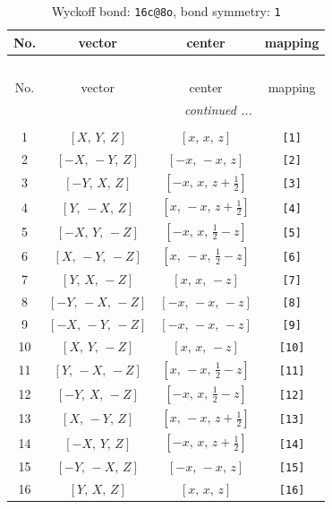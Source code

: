 \documentclass[fleqn,8pt]{jsarticle}
\begin{document}
\begin{longtable}{cccc}
\caption{Wyckoff bond: {\tt 16c@8o}, bond symmetry: {\tt 1}}
 \\
 \hline \hline
No. & vector & center & mapping \\ \hline \endfirsthead

\multicolumn{3}{l}{\tablename\ \thetable{}} \\
 \hline \hline
No. & vector & center & mapping \\ \hline \endhead

 \hline \hline
\multicolumn{3}{r}{\footnotesize\it continued ...} \\ \endfoot

 \hline \hline
\multicolumn{3}{r}{} \\ \endlastfoot

1 & $\left[ X,\, Y,\, Z \right]$ & $\left[ x,\, x,\, z \right]$ & {\tt [1]} \\ \hline
2 & $\left[ - X,\, - Y,\, Z \right]$ & $\left[ - x,\, - x,\, z \right]$ & {\tt [2]} \\ \hline
3 & $\left[ - Y,\, X,\, Z \right]$ & $\left[ - x,\, x,\, z + \frac{1}{2} \right]$ & {\tt [3]} \\ \hline
4 & $\left[ Y,\, - X,\, Z \right]$ & $\left[ x,\, - x,\, z + \frac{1}{2} \right]$ & {\tt [4]} \\ \hline
5 & $\left[ - X,\, Y,\, - Z \right]$ & $\left[ - x,\, x,\, \frac{1}{2} - z \right]$ & {\tt [5]} \\ \hline
6 & $\left[ X,\, - Y,\, - Z \right]$ & $\left[ x,\, - x,\, \frac{1}{2} - z \right]$ & {\tt [6]} \\ \hline
7 & $\left[ Y,\, X,\, - Z \right]$ & $\left[ x,\, x,\, - z \right]$ & {\tt [7]} \\ \hline
8 & $\left[ - Y,\, - X,\, - Z \right]$ & $\left[ - x,\, - x,\, - z \right]$ & {\tt [8]} \\ \hline
9 & $\left[ - X,\, - Y,\, - Z \right]$ & $\left[ - x,\, - x,\, - z \right]$ & {\tt [9]} \\ \hline
10 & $\left[ X,\, Y,\, - Z \right]$ & $\left[ x,\, x,\, - z \right]$ & {\tt [10]} \\ \hline
11 & $\left[ Y,\, - X,\, - Z \right]$ & $\left[ x,\, - x,\, \frac{1}{2} - z \right]$ & {\tt [11]} \\ \hline
12 & $\left[ - Y,\, X,\, - Z \right]$ & $\left[ - x,\, x,\, \frac{1}{2} - z \right]$ & {\tt [12]} \\ \hline
13 & $\left[ X,\, - Y,\, Z \right]$ & $\left[ x,\, - x,\, z + \frac{1}{2} \right]$ & {\tt [13]} \\ \hline
14 & $\left[ - X,\, Y,\, Z \right]$ & $\left[ - x,\, x,\, z + \frac{1}{2} \right]$ & {\tt [14]} \\ \hline
15 & $\left[ - Y,\, - X,\, Z \right]$ & $\left[ - x,\, - x,\, z \right]$ & {\tt [15]} \\ \hline
16 & $\left[ Y,\, X,\, Z \right]$ & $\left[ x,\, x,\, z \right]$ & {\tt [16]} \\
\end{longtable}
\end{document}
